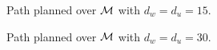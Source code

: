 				\begin{figure}
					\centering
					\caption{Path planned over ${\cal M}$ with $d_{w}=d_{u}=15$.}
					\label{fig::terrain_path_3}
				\end{figure}
				\begin{figure}
					\centering
					\caption{Path planned over ${\cal M}$ with $d_{w}=d_{u}=30$.}
					\label{fig::terrain_path_4}
				\end{figure}

